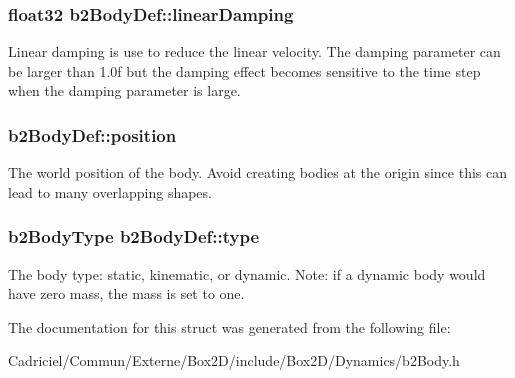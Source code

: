\subsubsection[{\texorpdfstring{linear\+Damping}{linearDamping}}]{\setlength{\rightskip}{0pt plus 5cm}float32 b2\+Body\+Def\+::linear\+Damping}\hypertarget{structb2_body_def_a728f6df3be7dedb331455105e3659d46}{}\label{structb2_body_def_a728f6df3be7dedb331455105e3659d46}
Linear damping is use to reduce the linear velocity. The damping parameter can be larger than 1.\+0f but the damping effect becomes sensitive to the time step when the damping parameter is large. 
\subsubsection[{\texorpdfstring{position}{position}}]{ b2\+Body\+Def\+::position}\hypertarget{structb2_body_def_a680cadc09ad6cf4b3366cbf0914c648b}{}\label{structb2_body_def_a680cadc09ad6cf4b3366cbf0914c648b}
The world position of the body. Avoid creating bodies at the origin since this can lead to many overlapping shapes. 
\subsubsection[{\texorpdfstring{type}{type}}]{\setlength{\rightskip}{0pt plus 5cm}b2\+Body\+Type b2\+Body\+Def\+::type}\hypertarget{structb2_body_def_a89cc3ad1873908042b002147b3861381}{}\label{structb2_body_def_a89cc3ad1873908042b002147b3861381}
The body type\+: static, kinematic, or dynamic. Note\+: if a dynamic body would have zero mass, the mass is set to one. 

The documentation for this struct was generated from the following file\+:\begin{DoxyCompactItemize}
\item 
Cadriciel/\+Commun/\+Externe/\+Box2\+D/include/\+Box2\+D/\+Dynamics/b2\+Body.\+h\end{DoxyCompactItemize}
